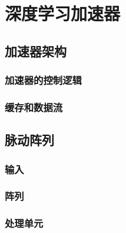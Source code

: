 
\chapter{深度学习加速器}

\section{加速器架构}

\subsection{加速器的控制逻辑}


\subsection{缓存和数据流}

\section{脉动阵列}

\subsection{输入}
\subsection{阵列}
\subsection{处理单元}
